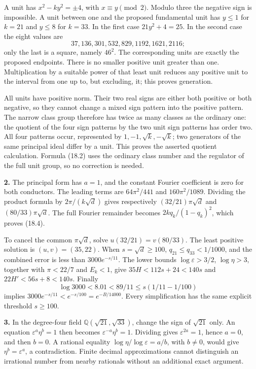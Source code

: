 \documentclass[
  11pt,
  a4paper,
]{article}
\begin{document}
A unit has \(x^2-ky^2=\pm4\), with \(x\equiv y\pmod2\). Modulo three the
negative sign is impossible. A unit between one and the proposed
fundamental unit has \(y\le1\) for \(k=21\) and \(y\le8\) for \(k=33\).
In the first case \(21y^2+4=25\). In the second case the eight values
are \[
 37,136,301,532,829,1192,1621,2116;
\] only the last is a square, namely \(46^2\). The corresponding units
are exactly the proposed endpoints. There is no smaller positive unit
greater than one. Multiplication by a suitable power of that least unit
reduces any positive unit to the interval from one up to, but excluding,
it; this proves generation.

All units have positive norm. Their two real signs are either both
positive or both negative, so they cannot change a mixed sign pattern
into the positive pattern. The narrow class group therefore has twice as
many classes as the ordinary one: the quotient of the four sign patterns
by the two unit sign patterns has order two. All four patterns occur,
represented by \(1,-1,\sqrt{k},-\sqrt{k}\); two generators of the same
principal ideal differ by a unit. This proves the asserted quotient
calculation. Formula (18.2) uses the ordinary class number and the
regulator of the full unit group, so no correction is needed.

\textbf{2.} The principal form has \(a=1\), and the constant Fourier
coefficient is zero for both conductors. The leading terms are
\(64\pi^2/441\) and \(160\pi^2/1089\). Dividing the product formula by
\(2\pi/(k\sqrt d)\) gives respectively \((32/21)\pi\sqrt d\) and
\((80/33)\pi\sqrt d\). The full Fourier remainder becomes
\(2kq_k/(1-q_k)^2\), which proves (18.4).

To cancel the common \(\pi\sqrt d\), solve \(u(32/21)=v(80/33)\). The
least positive solution is \((u,v)=(35,22)\). When \(s=\sqrt d\ge100\),
\(q_{21}\le q_{33}<1/1000\), and the combined error is less than
\(3000e^{-s/11}\). The lower bounds \(\log\varepsilon>3/2\),
\(\log\eta>3\), together with \(\pi<22/7\) and \(E_k<1\), give
\(35H<112s+24<140s\) and \(22H'<56s+8<140s\). Finally \[
 \log3000<8.01<89/11
       \le s(1/11-1/100)
\] implies \(3000e^{-s/11}<e^{-s/100}=e^{-B/14000}\). Every
simplification has the same explicit threshold \(s\ge100\).

\textbf{3.} In the degree-four field \(\mathbb Q(\sqrt{21},\sqrt{33})\),
change the sign of \(\sqrt{21}\) only. An equation
\(\varepsilon^a\eta^b=1\) then becomes \(\varepsilon^{-a}\eta^b=1\).
Dividing gives \(\varepsilon^{2a}=1\), hence \(a=0\), and then \(b=0\).
A rational equality \(\log\eta/\log\varepsilon=a/b\), with \(b\ne0\),
would give \(\eta^b=\varepsilon^a\), a contradiction. Finite decimal
approximations cannot distinguish an irrational number from nearby
rationals without an additional exact argument.
\end{document}
